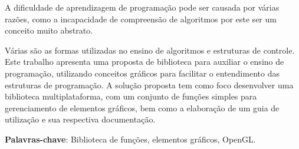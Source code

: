 \documentclass[12pt, %
openright,
oneside, %
a4paper,    %
brazil]{facom-ufu-abntex2}
\begin{document}







\begin{resumo} %
 A dificuldade de aprendizagem de programação pode ser causada por várias razões, como a incapacidade de compreensão de algoritmos por este ser um conceito muito abstrato.
 
 Várias são as formas utilizadas no ensino de algoritmos e estruturas de controle. Este trabalho apresenta uma proposta de biblioteca para auxiliar o ensino de programação, utilizando conceitos gráficos para facilitar o entendimento das estruturas de programação. A solução proposta tem como foco desenvolver uma biblioteca multiplataforma, com um conjunto de funções simples para gerenciamento de elementos gráficos, bem como a elaboração de um guia de utilização e sua respectiva documentação.

 \vspace{\onelineskip}

 \noindent
 \textbf{Palavras-chave}: Biblioteca de funções, elementos gráficos, OpenGL. %
\end{resumo}

\listoffigures*
\cleardoublepage

\iffalse
\pdfbookmark[0]{\listtablename}{lot}
\listoftables*
\cleardoublepage
\fi
\end{document}
